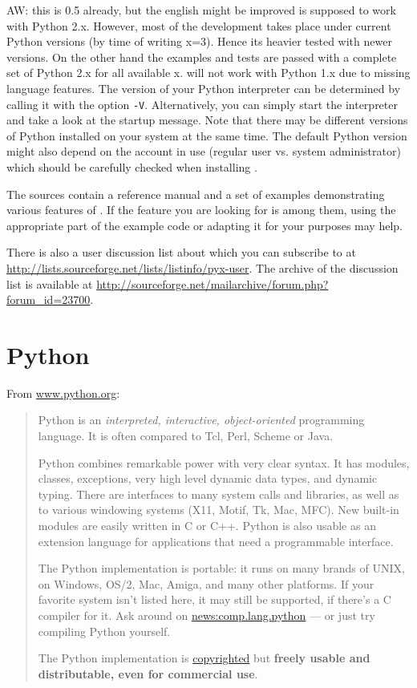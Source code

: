 \documentclass[11pt,DIV14]{scrartcl}
\begin{document}
{AW: this is 0.5 already, but the english might be improved}
{\PyX{} is supposed to work with Python 2.x. However, most of the
development takes place under current Python versions (by time of
writing x=3). Hence its heavier tested with newer versions. On the
other hand the examples and tests are passed with a complete set of
Python 2.x for all available x. \PyX{} will not work with Python 1.x
due to missing language features. The version of your Python
interpreter can be determined by calling it with the option
\texttt{-V}. Alternatively, you can simply start the interpreter and
take a look at the startup message. Note that there may be different
versions of Python installed on your system at the same time. The
default Python version might also depend on the account in use
(regular user vs. system administrator) which should be carefully
checked when installing \PyX.
}

{}
{The \PyX{} sources contain a reference manual and a set of examples 
demonstrating various features of \PyX. If the feature you are looking for is
among them, using the appropriate part of the example code or adapting it for
your purposes may help.

There is also a user discussion list about \PyX{} which you can subscribe to
at \url{http://lists.sourceforge.net/lists/listinfo/pyx-user}. The archive of
the discussion list is available at \url{http://sourceforge.net/mailarchive/forum.php?forum_id=23700}.
}

\section{Python}

{}
{\label{q:what_is_python}
From \url{www.python.org}:
\begin{quote}
Python is an \textit{interpreted, interactive, object-oriented} programming 
language. It is often compared to Tcl, Perl, Scheme or Java.

Python combines remarkable power with very clear syntax. It has modules, 
classes, exceptions, very high level dynamic data types, and dynamic typing. 
There are interfaces to many system calls and libraries, as well as to various 
windowing systems (X11, Motif, Tk, Mac, MFC). New built-in modules are easily 
written in C or C++. Python is also usable as an extension language for 
applications that need a programmable interface.

The Python implementation is portable: it runs on many brands of UNIX, on 
Windows, OS/2, Mac, Amiga, and many other platforms. If your favorite system 
isn't listed here, it may still be supported, if there's a C compiler for it. 
Ask around on \href{news:comp.lang.python}{news:comp.lang.python} --- or just 
try compiling Python yourself.

The Python implementation is 
\href{http://www.python.org/doc/Copyright.html}{copyrighted} 
but \textbf{freely usable and distributable, even for commercial use}.
\end{quote}
}
\end{document}
